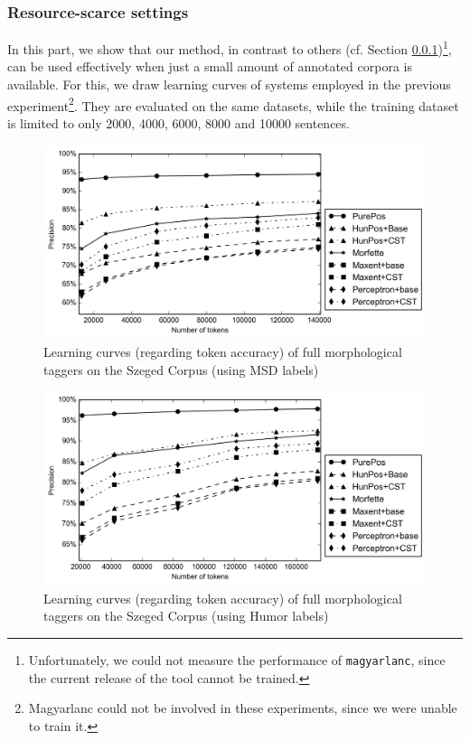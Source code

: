 \subsubsection{Resource-scarce settings}

In this part, we show that our method, in contrast to others (cf. Section \ref{})\footnote{Unfortunately, we could not measure the performance of \texttt{magyarlanc}, since the current release of the tool cannot be trained.}, can be used effectively when just a small amount of annotated corpora is available. 
For this, we draw learning curves of systems employed in the previous experiment\footnote{Magyarlanc could not be involved in these experiments, since we were unable to train it.}. 
They are evaluated on the same datasets, while the training dataset is limited to only 2000, 4000, 6000, 8000 and 10000 sentences. %

\begin{figure}[H]
  \centering
  \includegraphics[width=1\textwidth]{MorphTagging/msd_token.png} 
  \caption{Learning curves (regarding token accuracy) of full morphological taggers on the Szeged Corpus (using MSD labels)}
  \label{fig:msd-token}
\end{figure}

\begin{figure}[H]
  \centering
  \includegraphics[width=1\textwidth]{MorphTagging/humor_token.png}
  \caption{Learning curves (regarding token accuracy) of full morphological taggers on the Szeged Corpus (using Humor labels)}
  \label{fig:humor-token}
\end{figure}

